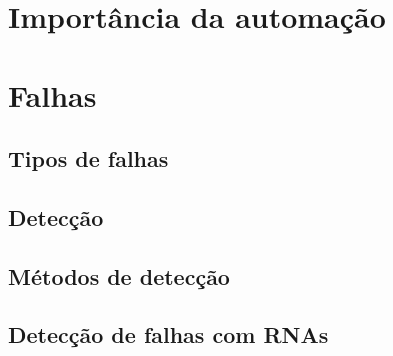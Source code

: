 \section{Importância da automação}

\section{Falhas}

\subsection{Tipos de falhas}

\subsection{Detecção}

\subsection{Métodos de detecção}

\subsection{Detecção de falhas com RNAs}
